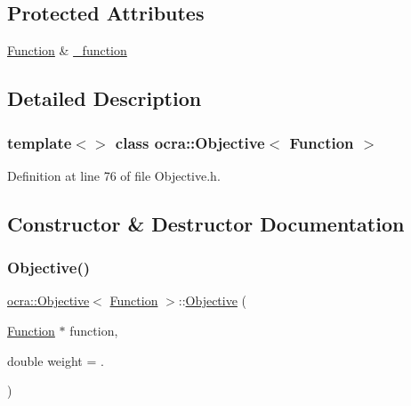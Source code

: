 \subsection*{Protected Attributes}
\begin{DoxyCompactItemize}
\item 
\hyperlink{classocra_1_1Function}{Function} \& \hyperlink{classocra_1_1Objective_3_01Function_01_4_a68d84f4b46839664695f62c12ed8092d}{\+\_\+function}
\end{DoxyCompactItemize}


\subsection{Detailed Description}
\subsubsection*{template$<$$>$\newline
class ocra\+::\+Objective$<$ Function $>$}



Definition at line 76 of file Objective.\+h.



\subsection{Constructor \& Destructor Documentation}
\hypertarget{classocra_1_1Objective_3_01Function_01_4_a5a469564d2691823b5e9e951c975b66c}{}\label{classocra_1_1Objective_3_01Function_01_4_a5a469564d2691823b5e9e951c975b66c} 
\subsubsection{\texorpdfstring{Objective()}{Objective()}}
{\footnotesize\ttfamily \hyperlink{classocra_1_1Objective}{ocra\+::\+Objective}$<$ \hyperlink{classocra_1_1Function}{Function} $>$\+::\hyperlink{classocra_1_1Objective}{Objective} (\begin{DoxyParamCaption}\item[{\hyperlink{classocra_1_1Function}{Function} $\ast$}]{function,  }\item[{double}]{weight = {.} }\end{DoxyParamCaption})\hspace{0.3cm}{\ttfamily [inline]}}

